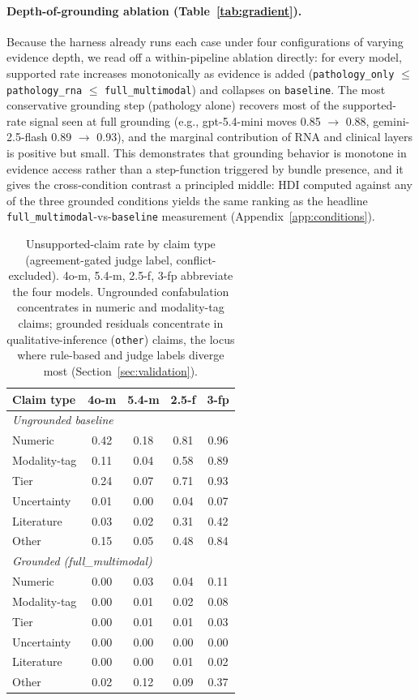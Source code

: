 \documentclass{article}
\theoremstyle{plain}
\begin{document}
\paragraph{Depth-of-grounding ablation (Table~\ref{tab:gradient}).}
Because the harness already runs each case under four configurations of varying evidence depth, we read off a within-pipeline ablation directly: for every model, supported rate increases monotonically as evidence is added (\texttt{pathology\_only} $\leq$ \texttt{pathology\_rna} $\leq$ \texttt{full\_multimodal}) and collapses on \texttt{baseline}. The most conservative grounding step (pathology alone) recovers most of the supported-rate signal seen at full grounding (e.g., gpt-5.4-mini moves 0.85 $\to$ 0.88, gemini-2.5-flash 0.89 $\to$ 0.93), and the marginal contribution of RNA and clinical layers is positive but small. This demonstrates that grounding behavior is monotone in evidence access rather than a step-function triggered by bundle presence, and it gives the cross-condition contrast a principled middle: HDI computed against any of the three grounded conditions yields the same ranking as the headline \texttt{full\_multimodal}-vs-\texttt{baseline} measurement (Appendix~\ref{app:conditions}).

\begin{table}[!t]
\centering
\small
\setlength{\tabcolsep}{4pt}
\begin{tabular}{lcccc}
\toprule
\textbf{Claim type} & \textbf{4o-m} & \textbf{5.4-m} & \textbf{2.5-f} & \textbf{3-fp} \\
\midrule
\multicolumn{5}{l}{\emph{Ungrounded baseline}} \\
Numeric        & 0.42 & 0.18 & 0.81 & 0.96 \\
Modality-tag   & 0.11 & 0.04 & 0.58 & 0.89 \\
Tier           & 0.24 & 0.07 & 0.71 & 0.93 \\
Uncertainty    & 0.01 & 0.00 & 0.04 & 0.07 \\
Literature     & 0.03 & 0.02 & 0.31 & 0.42 \\
Other          & 0.15 & 0.05 & 0.48 & 0.84 \\
\midrule
\multicolumn{5}{l}{\emph{Grounded (full\_multimodal)}} \\
Numeric        & 0.00 & 0.03 & 0.04 & 0.11 \\
Modality-tag   & 0.00 & 0.01 & 0.02 & 0.08 \\
Tier           & 0.00 & 0.01 & 0.01 & 0.03 \\
Uncertainty    & 0.00 & 0.00 & 0.00 & 0.00 \\
Literature     & 0.00 & 0.00 & 0.01 & 0.02 \\
Other          & 0.02 & 0.12 & 0.09 & 0.37 \\
\bottomrule
\end{tabular}
\caption{Unsupported-claim rate by claim type (agreement-gated judge label, conflict-excluded). 4o-m, 5.4-m, 2.5-f, 3-fp abbreviate the four models. Ungrounded confabulation concentrates in numeric and modality-tag claims; grounded residuals concentrate in qualitative-inference (\texttt{other}) claims, the locus where rule-based and judge labels diverge most (Section~\ref{sec:validation}).}
\label{tab:ctypes}
\end{table}
\end{document}
